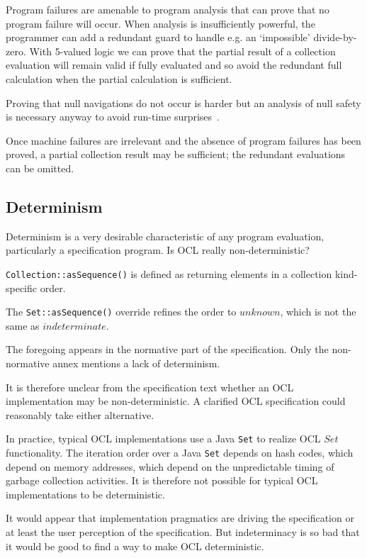 \documentclass{llncs}
\begin{document}
Program failures are amenable to program analysis that can prove that no program failure will occur. When analysis is insufficiently powerful, the programmer can add a redundant guard to handle e.g. an `impossible' divide-by-zero. With 5-valued logic we can prove that the partial result of a collection evaluation will remain valid if fully evaluated and so avoid the redundant full calculation when the partial calculation is sufficient.

Proving that null navigations do not occur is harder but an analysis of null safety is necessary anyway to avoid run-time surprises~\cite{Safe OCL}.

Once machine failures are irrelevant and the absence of program failures has been proved, a partial collection result may be sufficient; the redundant evaluations can be omitted.

\subsection{Determinism}

Determinism is a very desirable characteristic of any program evaluation, particularly a specification program. Is OCL really non-deterministic?
 
\verb$Collection::asSequence()$ is defined as returning elements in a collection kind-specific order.

The \verb$Set::asSequence()$ override refines the order to $unknown$, which is not the same as $indeterminate$. 

The foregoing appears in the normative part of the specification. Only the non-normative annex mentions a lack of determinism.

It is therefore unclear from the specification text whether an OCL implementation may be non-deterministic. A clarified OCL specification could reasonably take either alternative.

In practice, typical OCL implementations use a Java \verb$Set$ to realize OCL $Set$ functionality. The iteration order over a Java \verb$Set$ depends on hash codes, which depend on memory addresses, which depend on the unpredictable timing of garbage collection activities. It is therefore not possible for typical OCL implementations to be deterministic. 

It would appear that implementation pragmatics are driving the specification or at least the user perception of the specification. But indeterminacy is so bad that it would be good to find a way to make OCL deterministic.
\end{document}
